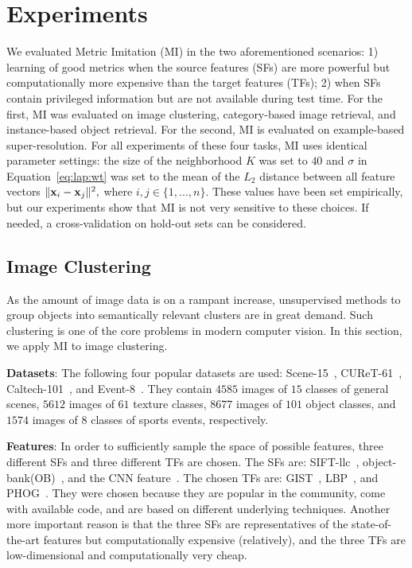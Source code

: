 
\section{Experiments} 
\label{mi:sec:exp}

We evaluated Metric Imitation (MI) in the two aforementioned
scenarios: 1) learning of good metrics when the source
features (SFs) are more powerful but computationally more expensive
than the target features (TFs); 2) when SFs contain privileged
information but are not available during test time. For the first, MI
was evaluated on image clustering, category-based image retrieval, and
instance-based object retrieval. For the second, MI is evaluated on
example-based super-resolution. For all experiments of these four
tasks, MI uses identical parameter settings: the size of the
neighborhood $K$ was set to $40$ and $\sigma$ in Equation~\ref{eq:lap:wt}
was set to the mean of the $L_2$ distance between all feature vectors $\|
{\mathbf x}_i - {\mathbf x}_j \|^2, $ where $i, j \in \{1, ..., n \}$. These
values have been set empirically, but our experiments show that MI is
not very sensitive to these choices. If needed, a cross-validation on
hold-out sets can be considered.



\subsection{Image Clustering}
\label{mi:sec:img:clustering}
As the amount of image data is on a rampant increase, unsupervised 
methods to group objects into semantically relevant clusters are in 
great demand. Such clustering is one of the core problems in modern
computer vision. In this section, we apply MI to image clustering.

\textbf{Datasets}: The following four popular datasets are used:
Scene-15~\citep{scene-15}, CUReT-61~\citep{CUReT-61},
Caltech-101~\citep{FeiFei2004}, and Event-8~\citep{event-8}. They contain
$4585$ images of $15$ classes of general scenes, $5612$ images of $61$
texture classes, $8677$ images of $101$ object classes, and $1574$
images of $8$ classes of sports events, respectively.

\textbf{Features}: In order to sufficiently sample the space of
possible features, three different SFs and three different TFs are
chosen. The SFs are: SIFT-llc~\citep{siftllc:cvpr10},
object-bank(OB)~\citep{objectbank:nips10}, and the CNN
feature~\citep{deep:bmvc14}. The chosen TFs are: GIST~\citep{gist},
LBP~\citep{lbp}, and PHOG~\citep{phog}. They were chosen because they
are popular in the community, come with available code, and are based
on different underlying techniques. Another more important reason is
that the three SFs are representatives of the state-of-the-art
features but computationally expensive (relatively), and the three TFs
are low-dimensional and computationally very cheap.

